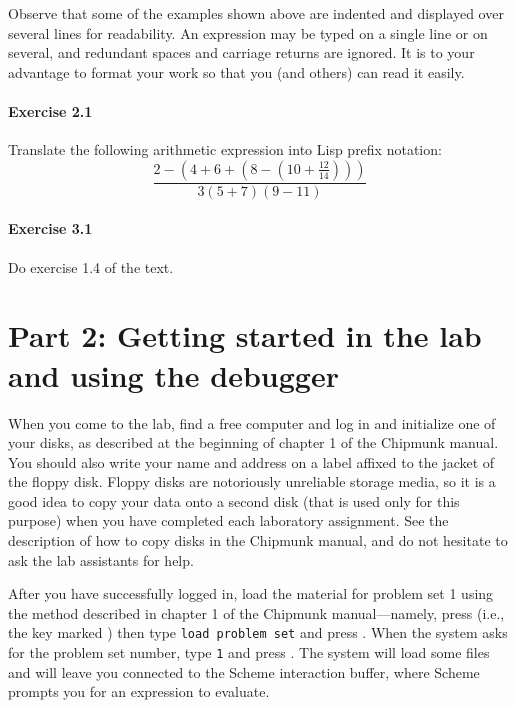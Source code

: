 Observe that some of the examples shown above are indented and
displayed over several lines for readability.  An expression may be
typed on a single line or on several, and redundant spaces and
carriage returns are ignored.  It is to your advantage to format your
work so that you (and others) can read it easily.

\paragraph{Exercise 2.1}
Translate the following arithmetic expression into Lisp prefix notation:
\begin{displaymath}
\frac{2-(4+6+(8-(10+\frac{12}{14})))}
     {3 (5+7) (9-11)}
\end{displaymath}

\paragraph{Exercise 3.1}
Do exercise 1.4 of the text.

\section{Part 2: Getting started in the lab and using the debugger}

When you come to the lab, find a free computer and log in and
initialize one of your disks, as described at the beginning of chapter
1 of the Chipmunk manual.  You should also write your name and address
on a label affixed to the jacket of the floppy disk.  Floppy disks are
notoriously unreliable storage media, so it is a good idea to copy
your data onto a second disk (that is used only for this purpose) when
you have completed each laboratory assignment.  See the description of
how to copy disks in the Chipmunk manual, and do not hesitate to ask
the lab assistants for help.

After you have successfully logged in, load the material for problem
set 1 using the method described in chapter 1 of the Chipmunk
manual---namely, press  (i.e., the key marked )
then type {\tt load problem set} and press .  When the
system asks for the problem set number, type {\tt 1} and press
.  The system will load some files and will leave you
connected to the Scheme interaction buffer, where Scheme prompts you
for an expression to evaluate.

